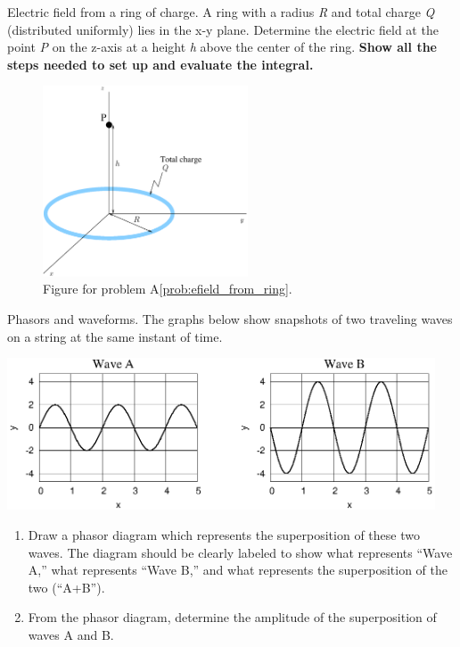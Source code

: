 \begin{aproblem}{Electric field from a ring of charge.}
  A ring with a radius {\it R} and total charge {\it Q} (distributed
  uniformly) lies in the x-y plane.  Determine the electric field at
  the point {\it P} on the z-axis at a height {\it h} above the center
  of the ring.  {\bf Show all the steps needed to set up and evaluate
    the integral.}
  \label{prob:efield_from_ring}
  \begin{figure}[h]
    \begin{center}
      \includegraphics[width=2.4in]{additional_problems/a102fig}
      \caption{Figure for problem A\ref{prob:efield_from_ring}.}
      \label{fig:a102}
    \end{center}
  \end{figure}
\end{aproblem}

\begin{aproblem}{ Phasors and waveforms.}
  The graphs below show snapshots of two traveling waves on a string
  at the same instant of time.
  \label{prob:phasors_and_waveforms}

  \begin{center}
    \includegraphics[width=5.0in]{additional_problems/a103fig}
  \end{center}

  \begin{enumerate}
  \item Draw a phasor diagram which represents the superposition of
    these two waves.  The diagram should be clearly labeled to show
    what represents ``Wave A,'' what represents ``Wave B,'' and what
    represents the superposition of the two (``A+B'').

  \item From the phasor diagram, determine the amplitude of the
    superposition of waves A and B.

  \end{enumerate}
\end{aproblem}

